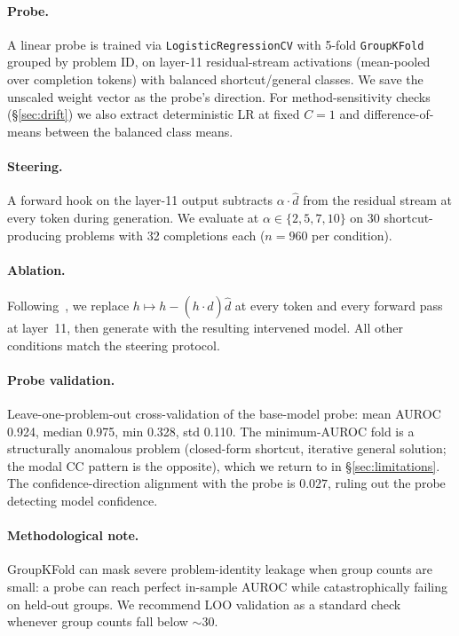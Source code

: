 \documentclass[11pt]{article}
\begin{document}
\paragraph{Probe.} A linear probe is trained via
\texttt{Logistic\-Regression\-CV} with 5-fold \texttt{GroupKFold} grouped
by problem ID, on layer-11 residual-stream activations (mean-pooled
over completion tokens) with balanced shortcut/general classes. We save
the unscaled weight vector as the probe's direction. For
method-sensitivity checks (\S\ref{sec:drift}) we also extract
deterministic LR at fixed $C{=}1$ and difference-of-means between the
balanced class means.

\paragraph{Steering.} A forward hook on the layer-11 output subtracts
$\alpha \cdot \hat d$ from the residual stream at every token during
generation. We evaluate at $\alpha \in \{2, 5, 7, 10\}$ on 30
shortcut-producing problems with 32 completions each ($n{=}960$ per
condition).

\paragraph{Ablation.} Following~\citet{arditi2024refusal}, we replace
$h \mapsto h - (h \cdot \hat d)\hat d$ at every token and every forward
pass at layer~11, then generate with the resulting intervened model.
All other conditions match the steering protocol.

\paragraph{Probe validation.} Leave-one-problem-out cross-validation of
the base-model probe: mean AUROC 0.924, median 0.975, min 0.328, std
0.110. The minimum-AUROC fold is a structurally anomalous problem
(closed-form shortcut, iterative general solution; the modal CC
pattern is the opposite), which we return to in
\S\ref{sec:limitations}. The confidence-direction alignment with the
probe is $0.027$, ruling out the probe detecting model confidence.

\paragraph{Methodological note.} GroupKFold can mask severe
problem-identity leakage when group counts are small: a probe can reach
perfect in-sample AUROC while catastrophically failing on held-out
groups. We recommend LOO validation as a standard check whenever group
counts fall below ${\sim}30$.
\end{document}
